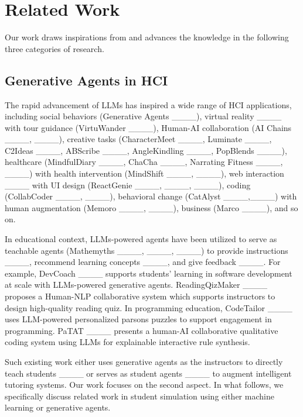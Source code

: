 \section{Related Work}
\label{sec:related}



Our work draws inspirations from and advances the knowledge in the following three categories of research.


\subsection{Generative Agents in HCI}


The rapid advancement of LLMs has inspired a wide range of HCI applications, including social behaviors (Generative Agents ____), virtual reality ____ with tour guidance (VirtuWander ____), Human-AI collaboration (AI Chains ____, ____), creative tasks (CharacterMeet ____, Luminate ____, C2Ideas ____, ABScribe ____, AngleKindling ____, PopBlends ____), healthcare (MindfulDiary ____, ChaCha ____, Narrating Fitness ____, ____) with health intervention (MindShift ____, ____), web interaction ____ with UI design (ReactGenie ____, ____, ____), coding (CollabCoder ____, ____), behavioral change (CatAlyst ____,____) with human augmentation (Memoro ____, ____), business (Marco ____), and so on.


In educational context, LLMs-powered agents have been utilized to serve as teachable agents (Mathemyths ____, ____, ____) to provide instructions ____, recommend learning concepts ____, and give feedback ____. For example, DevCoach ____ supports students' learning in software development at scale with LLMs-powered generative agents. ReadingQizMaker ____ proposes a Human-NLP collaborative system which supports instructors to design high-quality reading quiz. In programming education, CodeTailor ____ uses LLM-powered personalized parsons puzzles to support engagement in programming. PaTAT ____ presents a human-AI collaborative qualitative coding system using LLMs for explainable interactive rule synthesis. 

Such existing work either uses generative agents as the instructors to directly teach students ____ or serves as student agents ____ to augment intelligent tutoring systems. 
Our work focuses on the second aspect. In what follows, we specifically discuss related work in student simulation using either machine learning or generative agents.


